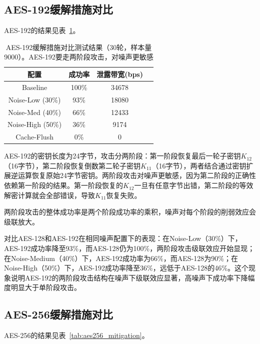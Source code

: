 \subsection{AES-192缓解措施对比}

AES-192的结果见表~\ref{tab:aes192_mitigation}。

\begin{table}[htbp]
    \centering
    \caption{AES-192缓解措施对比测试结果（30轮，样本量9000）。AES-192要走两阶段攻击，对噪声更敏感}
    \label{tab:aes192_mitigation}
    \begin{tabular}{cccc}
        \toprule
        配置 & 成功率 & 泄露带宽(bps) \\
        \midrule
        Baseline & 100\% & 34678 \\
        Noise-Low (30\%) & 93\% & 18080 \\
        Noise-Med (40\%) & 66\% & 12433 \\
        Noise-High (50\%) & 36\% & 9174 \\
        Cache-Flush & 0\% & 0 \\
        \bottomrule
    \end{tabular}
\end{table}

AES-192的密钥长度为24字节，攻击分两阶段：第一阶段恢复最后一轮子密钥$K_{12}$（16字节），第二阶段恢复倒数第二轮子密钥$K_{11}$（16字节），两者结合通过密钥扩展逆运算恢复原始24字节密钥。两阶段攻击对噪声更敏感，因为第二阶段的正确性依赖第一阶段的结果。第一阶段恢复的$K_{12}$一旦有任意字节出错，第二阶段的等效解密计算就会全部错误，导致$K_{11}$恢复失败。

两阶段攻击的整体成功率是两个阶段成功率的乘积，噪声对每个阶段的削弱效应会级联放大。

对比AES-128和AES-192在相同噪声配置下的表现：在Noise-Low（30\%）下，AES-192成功率降至93\%，而AES-128仍为100\%，两阶段攻击级联效应开始显现；在Noise-Medium（40\%）下，AES-192成功率为66\%，而AES-128为90\%；在Noise-High（50\%）下，AES-192成功率降至36\%，远低于AES-128的46\%。这个现象说明AES-192的两阶段攻击结构在噪声下级联效应显著，高噪声下成功率下降幅度明显大于单阶段攻击。

\subsection{AES-256缓解措施对比}

AES-256的结果见表~\ref{tab:aes256_mitigation}。

